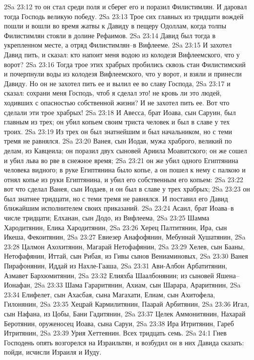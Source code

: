 2Sa 23:12  то он стал среди поля и сберег его и поразил Филистимлян. И даровал тогда Господь великую победу.
2Sa 23:13  Трое сих главных из тридцати вождей пошли и вошли во время жатвы к Давиду в пещеру Одоллам, когда толпы Филистимлян стояли в долине Рефаимов.
2Sa 23:14  Давид был тогда в укрепленном месте, а отряд Филистимлян--в Вифлееме.
2Sa 23:15  И захотел Давид пить, и сказал: кто напоит меня водою из колодезя Вифлеемского, что у ворот?
2Sa 23:16  Тогда трое этих храбрых пробились сквозь стан Филистимский и почерпнули воды из колодезя Вифлеемского, что у ворот, и взяли и принесли Давиду. Но он не захотел пить ее и вылил ее во славу Господа,
2Sa 23:17  и сказал: сохрани меня Господь, чтоб я сделал это! не кровь ли это людей, ходивших с опасностью собственной жизни? И не захотел пить ее. Вот что сделали эти трое храбрых!
2Sa 23:18  И Авесса, брат Иоава, сын Саруин, был главным из трех; он убил копьем своим триста человек и был в славе у тех троих.
2Sa 23:19  Из трех он был знатнейшим и был начальником, но с теми тремя не равнялся.
2Sa 23:20  Ванея, сын Иодая, мужа храброго, великий по делам, из Кавцеила; он поразил двух сыновей Ариила Моавитского; он же сошел и убил льва во рве в снежное время;
2Sa 23:21  он же убил одного Египтянина человека видного; в руке Египтянина было копье, а он пошел к нему с палкою и отнял копье из руки Египтянина, и убил его собственным его копьем:
2Sa 23:22  вот что сделал Ванея, сын Иодаев, и он был в славе у трех храбрых;
2Sa 23:23  он был знатнее тридцати, но с теми тремя не равнялся. И поставил его Давид ближайшим исполнителем своих приказаний.
2Sa 23:24  Асаил, брат Иоава--в числе тридцати; Елханан, сын Додо, из Вифлеема,
2Sa 23:25  Шамма Хародитянин, Елика Хародитянин,
2Sa 23:26  Херец Палтитянин, Ира, сын Икеша, Фекоитянин,
2Sa 23:27  Евиезер Анафофянин, Мебуннай Хушатянин,
2Sa 23:28  Цалмон Ахохитянин, Магарай Нетофафянин,
2Sa 23:29  Хелев, сын Бааны, Нетофафянин, Иттай, сын Рибая, из Гивы сынов Вениаминовых,
2Sa 23:30  Ванея Пирафонянин, Иддай из Нахле-Гааша,
2Sa 23:31  Ави-Албон Арбатитянин, Азмавет Бархюмитянин,
2Sa 23:32  Елияхба Шаалбонянин; из сыновей Яшена--Ионафан,
2Sa 23:33  Шама Гараритянин, Ахиам, сын Шарара, Араритянин,
2Sa 23:34  Елифелет, сын Ахасбая, сына Магахати, Елиам, сын Ахитофела, Гилонянин,
2Sa 23:35  Хецрай Кармилитянин, Паарай Арбитянин,
2Sa 23:36  Игал, сын Нафана, из Цобы, Бани Гадитянин,
2Sa 23:37  Целек Аммонитянин, Нахарай Беротянин, оруженосец Иоава, сына Саруи,
2Sa 23:38  Ира Итритянин, Гареб Итритянин,
2Sa 23:39  Урия Хеттеянин. Всех тридцать семь.
2Sa 24:1  Гнев Господень опять возгорелся на Израильтян, и возбудил он в них Давида сказать: пойди, исчисли Израиля и Иуду.
